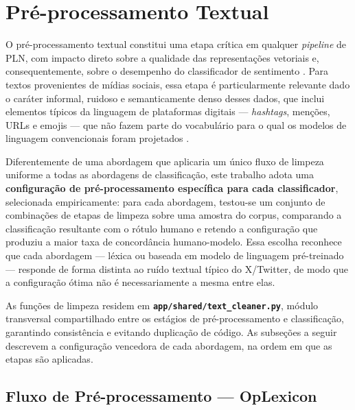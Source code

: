 
\section{Pré-processamento Textual}
\label{sec:preprocessamento}

O pré-processamento textual constitui uma etapa crítica em qualquer \textit{pipeline} de PLN, com impacto direto sobre a qualidade das representações vetoriais e, consequentemente, sobre o desempenho do classificador de sentimento \cite{caseli2024cap1}. Para textos provenientes de mídias sociais, essa etapa é particularmente relevante dado o caráter informal, ruidoso e semanticamente denso desses dados, que inclui elementos típicos da linguagem de plataformas digitais --- \textit{hashtags}, menções, URLs e emojis --- que não fazem parte do vocabulário para o qual os modelos de linguagem convencionais foram projetados \cite{santana2024cap34}.

Diferentemente de uma abordagem que aplicaria um único fluxo de limpeza uniforme a todas as abordagens de classificação, este trabalho adota uma \textbf{configuração de pré-processamento específica para cada classificador}, selecionada empiricamente: para cada abordagem, testou-se um conjunto de combinações de etapas de limpeza sobre uma amostra do corpus, comparando a classificação resultante com o rótulo humano e retendo a configuração que produziu a maior taxa de concordância humano-modelo. Essa escolha reconhece que cada abordagem --- léxica ou baseada em modelo de linguagem pré-treinado --- responde de forma distinta ao ruído textual típico do X/Twitter, de modo que a configuração ótima não é necessariamente a mesma entre elas.

As funções de limpeza residem em \textbf{\texttt{app/shared/text\_cleaner.py}}, módulo transversal compartilhado entre os estágios de pré-processamento e classificação, garantindo consistência e evitando duplicação de código. As subseções a seguir descrevem a configuração vencedora de cada abordagem, na ordem em que as etapas são aplicadas.

\subsection{Fluxo de Pré-processamento --- OpLexicon}
\label{subsec:fluxo_oplexicon}

